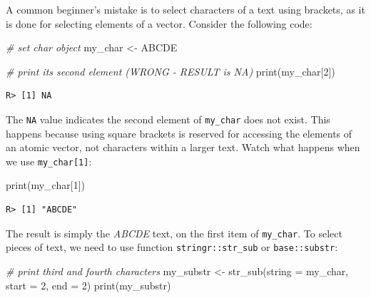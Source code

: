 \documentclass[
  12pt,
]{book}
\newenvironment{Shaded}{\begin{snugshade}}{\end{snugshade}}
\newcommand{\AttributeTok}[1]{\textcolor[rgb]{0.61,0.61,0.61}{#1}}
\newcommand{\CommentTok}[1]{\textcolor[rgb]{0.37,0.37,0.37}{\textit{#1}}}
\newcommand{\DecValTok}[1]{\textcolor[rgb]{0.06,0.06,0.06}{#1}}
\newcommand{\FunctionTok}[1]{\textcolor[rgb]{0,0,0}{#1}}
\newcommand{\NormalTok}[1]{#1}
\newcommand{\OtherTok}[1]{\textcolor[rgb]{0.37,0.37,0.37}{#1}}
\newcommand{\StringTok}[1]{\textcolor[rgb]{0.5,0.5,0.5}{#1}}
\begin{document}
A common beginner's mistake is to select characters of a text using brackets, as it is done for selecting elements of a vector. Consider the following code:

\begin{Shaded}
\begin{Highlighting}[]
\CommentTok{\# set char object}
\NormalTok{my\_char }\OtherTok{\textless{}{-}} \StringTok{\textquotesingle{}ABCDE\textquotesingle{}}

\CommentTok{\# print its second element (WRONG {-} RESULT is NA)}
\FunctionTok{print}\NormalTok{(my\_char[}\DecValTok{2}\NormalTok{])}
\end{Highlighting}
\end{Shaded}

\begin{verbatim}
R> [1] NA
\end{verbatim}

The \texttt{NA} value indicates the second element of \texttt{my\_char} does not exist. This happens because using square brackets is reserved for accessing the elements of an atomic vector, not characters within a larger text. Watch what happens when we use \texttt{my\_char{[}1{]}}:

\begin{Shaded}
\begin{Highlighting}[]
\FunctionTok{print}\NormalTok{(my\_char[}\DecValTok{1}\NormalTok{])}
\end{Highlighting}
\end{Shaded}

\begin{verbatim}
R> [1] "ABCDE"
\end{verbatim}

The result is simply the \emph{ABCDE} text, on the first item of \texttt{my\_char}. To select pieces of text, we need to use function \texttt{stringr::str\_sub} or \texttt{base::substr}:  

\begin{Shaded}
\begin{Highlighting}[]
\CommentTok{\# print third and fourth characters}
\NormalTok{my\_substr }\OtherTok{\textless{}{-}} \FunctionTok{str\_sub}\NormalTok{(}\AttributeTok{string =}\NormalTok{ my\_char,}
                     \AttributeTok{start =} \DecValTok{2}\NormalTok{,}
                     \AttributeTok{end =} \DecValTok{2}\NormalTok{)}
\FunctionTok{print}\NormalTok{(my\_substr)}
\end{Highlighting}
\end{Shaded}
\end{document}
